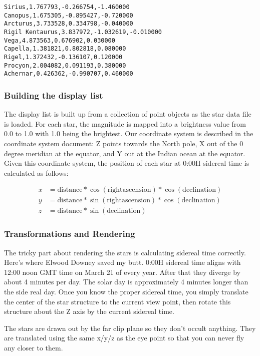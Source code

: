 \documentclass[12pt]{article}
\begin{document}
\begin{verbatim}
Sirius,1.767793,-0.266754,-1.460000
Canopus,1.675305,-0.895427,-0.720000
Arcturus,3.733528,0.334798,-0.040000
Rigil Kentaurus,3.837972,-1.032619,-0.010000
Vega,4.873563,0.676902,0.030000
Capella,1.381821,0.802818,0.080000
Rigel,1.372432,-0.136107,0.120000
Procyon,2.004082,0.091193,0.380000
Achernar,0.426362,-0.990707,0.460000
\end{verbatim}

\subsubsection{Building the display list}

The display list is built up from a collection of point objects as the
star data file is loaded.  For each star, the magnitude is mapped into
a brightness value from 0.0 to 1.0 with 1.0 being the brightest.  Our
coordinate system is described in the coordinate system document: Z
points towards the North pole, X out of the 0 degree meridian at the
equator, and Y out at the Indian ocean at the equator.  Given this
coordinate system, the position of each star at 0:00H sidereal time is
calculated as follows:

\begin{align}
x &= \mathrm{distance} * \cos(\mathrm{rightascension}) * 
     \cos(\mathrm{declination}) \\
y &= \mathrm{distance} * \sin(\mathrm{rightascension}) * 
     \cos(\mathrm{declination}) \\
z &= \mathrm{distance} * \sin(\mathrm{declination})
\end{align}

\subsubsection{Transformations and Rendering}

The tricky part about rendering the stars is calculating sidereal time
correctly.  Here's where Elwood Downey saved my butt.  0:00H sidereal
time aligns with 12:00 noon GMT time on March 21 of every year.  After
that they diverge by about 4 minutes per day.  The solar day is
approximately 4 minutes longer than the side real day.  Once you know
the proper sidereal time, you simply translate the center of the star
structure to the current view point, then rotate this structure about
the Z axis by the current sidereal time.

The stars are drawn out by the far clip plane so they don't occult
anything.  They are translated using the same x/y/z as the eye point
so that you can never fly any closer to them.
\end{document}

